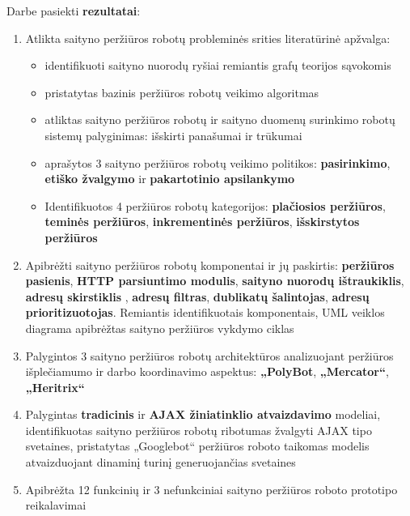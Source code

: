 
Darbe pasiekti \textbf{rezultatai}: 

\begin{enumerate}
    \item Atlikta saityno peržiūros robotų probleminės srities literatūrinė apžvalga: 
    \begin{itemize}
        \item identifikuoti saityno nuorodų ryšiai remiantis grafų teorijos sąvokomis
        \item pristatytas bazinis peržiūros robotų veikimo algoritmas
        \item atliktas saityno peržiūros robotų ir saityno duomenų surinkimo robotų sistemų palyginimas: išskirti panašumai ir trūkumai
        \item aprašytos 3 saityno peržiūros robotų veikimo politikos: \textbf{pasirinkimo}, \textbf{etiško žvalgymo} ir \textbf{pakartotinio apsilankymo}
        \item Identifikuotos 4 peržiūros robotų kategorijos: \textbf{plačiosios peržiūros}, \textbf{teminės peržiūros}, \textbf{inkrementinės peržiūros}, \textbf{išskirstytos peržiūros}
    \end{itemize}
    
    \item Apibrėžti saityno peržiūros robotų komponentai ir jų paskirtis: \textbf{peržiūros pasienis}, \textbf{HTTP parsiuntimo modulis}, \textbf{saityno nuorodų ištraukiklis}, \textbf{adresų skirstiklis} , \textbf{adresų filtras}, \textbf{dublikatų šalintojas}, \textbf{adresų prioritizuotojas}. Remiantis identifikuotais komponentais, UML veiklos diagrama apibrėžtas saityno peržiūros vykdymo ciklas
    
    
    \item Palygintos 3 saityno peržiūros robotų architektūros analizuojant peržiūros išplečiamumo ir darbo koordinavimo aspektus: \textbf{„PolyBot}, \textbf{„Mercator“}, \textbf{„Heritrix“} 
    
    
    \item Palygintas \textbf{tradicinis} ir \textbf{AJAX žiniatinklio atvaizdavimo} modeliai, identifikuotas saityno peržiūros robotų ribotumas žvalgyti AJAX tipo svetaines, pristatytas „Googlebot“ peržiūros roboto taikomas modelis atvaizduojant dinaminį turinį generuojančias svetaines
    
    
    \item Apibrėžta 12 funkcinių ir 3 nefunkciniai saityno peržiūros roboto prototipo reikalavimai
    

\end{enumerate}
